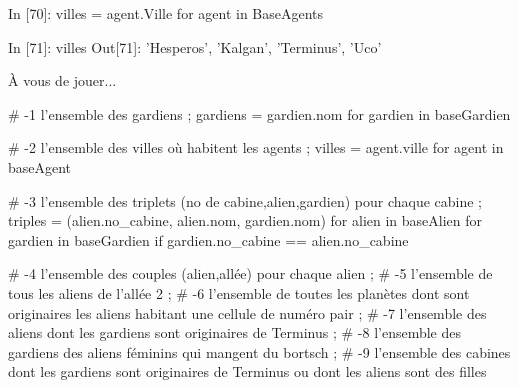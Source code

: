 \documentclass[french]{beamer}
\begin{document}
\begin{frame}[fragile]
\begin{pythoncode}
In [70]: villes = { agent.Ville for agent in BaseAgents }

In [71]: villes
Out[71]: {'Hesperos', 'Kalgan', 'Terminus', 'Uco'}
\end{pythoncode}


\end{frame}

\begin{frame}
  À vous de jouer...
\end{frame}


\begin{frame}[fragile]
\begin{pythoncode}
# -1 l'ensemble des gardiens ;
gardiens = { gardien.nom for gardien in baseGardien }
\end{pythoncode}
\end{frame}

\begin{frame}[fragile]
\begin{pythoncode}
# -2 l'ensemble des villes où habitent les agents ;
villes = { agent.ville for agent in baseAgent }
\end{pythoncode}
\end{frame}

\begin{frame}[fragile]
\begin{pythoncode}
# -3 l'ensemble des triplets (no de cabine,alien,gardien) pour chaque cabine ;
triples = { (alien.no_cabine, alien.nom, gardien.nom)
            for alien in baseAlien
            for gardien in baseGardien if gardien.no_cabine == alien.no_cabine}
\end{pythoncode}
\end{frame}

\begin{frame}[fragile]
\begin{pythoncode}
# -4 l'ensemble des couples (alien,allée) pour chaque alien ;
# -5 l'ensemble de tous les aliens de l'allée 2 ;
# -6 l'ensemble de toutes les planètes dont sont originaires les aliens habitant une cellule de numéro pair ;
# -7 l'ensemble des aliens dont les gardiens sont originaires de Terminus ;
# -8 l'ensemble des gardiens des aliens féminins qui mangent du bortsch ;
# -9 l'ensemble des cabines dont les gardiens sont originaires de Terminus ou dont les aliens sont des filles
 \end{pythoncode}
\end{frame}
\end{document}
